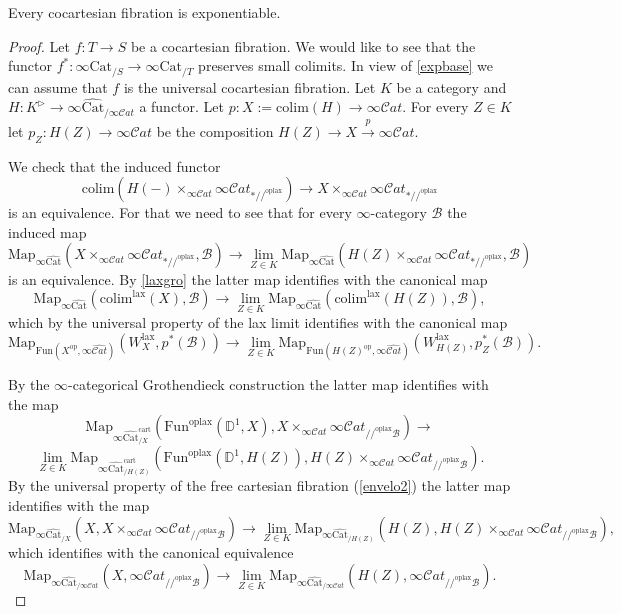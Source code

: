 \documentclass[10pt,oneside]{article}
\numberwithin{equation}{section} %
\numberwithin{figure}{section} %
\theoremstyle{plain}
\theoremstyle{definition}
\newcommand{\bD}{{\mathbb D}}
\newcommand{\mB}{{\mathcal B}}
\newcommand{\K}{{K}}
\newcommand{\W}{W}
\newcommand{\op}{\mathrm{op}}
\newcommand{\colim}{\mathrm{colim}}
\newcommand{\Cat}{\mathrm{Cat}}
\newcommand{\Fun}{\mathrm{Fun}}
\newcommand{\cart}{{\mathrm{cart}}}
\newcommand{\lax}{{\mathrm{lax}}}
\newcommand{\oplax}{{\mathrm{oplax}}}
\newcommand{\Map}{{\mathrm{Map}}}
\newcommand{\scat}{\mathcal{C}\mathit{at}}
\begin{document}
\begin{theorem}\label{expone}

Every cocartesian fibration is exponentiable.

\end{theorem}

\begin{proof}

Let $f:T\to S$ be a cocartesian fibration. We would like to see that the functor $f^*:\infty\Cat_{/S}\to\infty\Cat_{/T}$ preserves small colimits.
In view of \cref{expbase} we can assume that $f$ is the universal cocartesian fibration.
Let $K$ be a category and $H: K^{\triangleright} \to \infty\widehat{\Cat}_{/ \infty\scat}$ a functor.
Let $ p: X := \colim(H) \to \infty\scat.$
For every $Z \in K$ let $p_Z: H(Z) \to \infty\scat$
be the composition $H(Z) \to X \xrightarrow{p} \infty\scat.$

We check that the induced functor
$$ \colim(H(-)\times_{\infty\scat} \infty\scat_{*//^\oplax}) \to X \times_{\infty\scat} \infty\scat_{*//^\oplax} $$
is an equivalence.
For that we need to see that for every $\infty$-category $\mB$
the induced map
$$\Map_{\infty\widehat{\Cat}}(X \times_{\infty\scat} \infty\scat_{*//^\oplax}, \mB) \to \lim_{Z\in \K}\Map_{\infty\widehat{\Cat}}(H(Z)\times_{\infty\scat} \infty\scat_{*//^\oplax},\mB) $$
is an equivalence.
By \cref{laxgro} the latter map identifies with the canonical map
$$\Map_{\infty\widehat{\Cat}}(\colim^\lax(X), \mB) \to \lim_{Z\in K} \Map_{\infty\widehat{\Cat}}(\colim^\lax(H(Z)),\mB),$$
which by the universal property of the lax limit identifies with the canonical map
$$\Map_{\Fun(X^\op, \infty\widehat{\scat})}(\W_{X}^\lax, p^*(\mB)) \to \lim_{Z\in K} \Map_{\Fun(H(Z)^\op, \infty\widehat{\scat})}(\W_{H(Z)}^\lax, p_Z^*(\mB)).$$

By the $\infty$-categorical Grothendieck construction the latter map identifies with the map
$$\Map_{\infty\widehat{\Cat}^\cart_{/X}}(\Fun^\oplax(\bD^1,X), X\times_{\infty\scat}\infty\scat_{//^\oplax\mB}) \to $$$$ \lim_{Z\in K} \Map_{\infty\widehat{\Cat}^\cart_{/H(Z)}}(\Fun^\oplax(\bD^1,H(Z)), H(Z)\times_{\infty\scat}\infty\scat_{//^\oplax\mB}).$$
By the universal property of the free cartesian fibration (\cref{envelo2}) the latter map identifies with the map
$$\Map_{\infty\widehat{\Cat}_{/X}}(X, X\times_{\infty\scat}\infty\scat_{//^\oplax\mB}) \to \lim_{Z\in K} \Map_{\infty\widehat{\Cat}_{/H(Z)}}(H(Z), H(Z)\times_{\infty\scat}\infty\scat_{//^\oplax\mB}),$$
which identifies with the canonical equivalence
$$\Map_{\infty\widehat{\Cat}_{/\infty\scat}}(X, \infty\scat_{//^\oplax\mB}) \to \lim_{Z\in K} \Map_{\infty\widehat{\Cat}_{/\infty\scat}}(H(Z), \infty\scat_{//^\oplax\mB}). $$
\end{proof}
\end{document}
